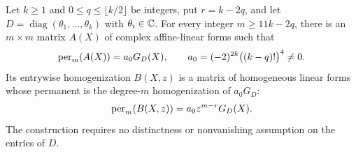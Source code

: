 \begin{proposition}\label{prop:selector}
Let $k\ge1$ and $0\le q\le\lfloor k/2\rfloor$ be integers, put $r=k-2q$,
and let $D=\operatorname{diag}(\theta_1,\ldots,\theta_k)$ with
$\theta_i\in\mathbb C$.  For every integer $m\ge11k-2q$, there is an $m\times m$
matrix $A(X)$ of complex affine-linear forms such that
\begin{equation}
 \operatorname{per}_m(A(X))=a_0G_D(X),
 \qquad a_0=(-2)^{2k}\big((k-q)!\big)^4\ne0.
 \label{eq:selector-scalar}
\end{equation}
Its entrywise homogenization $B(X,z)$ is a matrix of homogeneous linear
forms whose permanent is the degree-$m$ homogenization of $a_0G_D$:
\begin{equation}
 \operatorname{per}_m(B(X,z))=a_0z^{m-r}G_D(X).
 \label{eq:selector-homogeneous}
\end{equation}
The construction requires no distinctness or nonvanishing assumption on
the entries of $D$.
\end{proposition}

